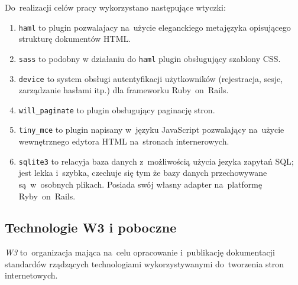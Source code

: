 Do~realizacji celów pracy wykorzystano następujące wtyczki:

\begin{enumerate}
  \item \texttt{haml}\cite{haml} to plugin pozwalajacy na~użycie eleganckiego metajęzyka opisującego strukturę dokumentów HTML.
  \item \texttt{sass}\cite{sass} to podobny w działaniu do \texttt{haml} plugin obsługujący szablony CSS.
  \item \texttt{device}\cite{devise} to system obsługi autentyfikacji użytkowników (rejestracja, sesje, zarządzanie hasłami itp.) dla frameworku Ruby~on~Rails.
  \item \texttt{will\_paginate}\cite{will.paginate} to plugin obsługujący paginację stron.
  \item \texttt{tiny\_mce}\cite{tiny.mce} to plugin napisany w~języku JavaScript pozwalający na~użycie wewnętrznego edytora HTML na~stronach internerowych.
  \item \texttt{sqlite3}\cite{sqlite3} to relacyja baza danych z~możliwością użycia jezyka zapytań SQL; jest lekka i~szybka, czechuje się tym że bazy danych przechowywane są~w~osobnych plikach. Posiada swój własny adapter na~platformę Ryby~on~Rails.
\end{enumerate}


\subsection{Technologie W3 i poboczne} \label{technologie.web}

\textit{W3}\cite{w3} to~organizacja mająca na~celu opracowanie i~publikację dokumentacji standardów rządzących technologiami wykorzystywanymi do~tworzenia stron internetowych.

